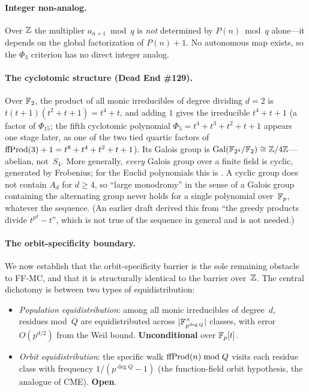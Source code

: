 \paragraph{Integer non-analog.}
Over $\mathbb{Z}$ the multiplier $a_{n+1} \bmod q$ is \emph{not} determined by
$P(n) \bmod q$ alone---it depends on the global factorization of
$P(n)+1$.  No autonomous map exists, so the $\Phi_3$ criterion has no
direct integer analog.

\paragraph{The cyclotomic structure (Dead End \#129).}
Over $\mathbb{F}_2$, the product of all monic irreducibles of degree dividing
$d=2$ is $t(t+1)(t^2+t+1) = t^4+t$, and adding $1$ gives the irreducible
$t^4 + t + 1$ (a factor of $\Phi_{15}$; the fifth cyclotomic polynomial
$\Phi_5 = t^4+t^3+t^2+t+1$ appears one stage later, as one of the two
tied quartic factors of $\mathrm{ffProd}(3)+1 = t^8+t^4+t^2+t+1$).  Its Galois
group is $\mathrm{Gal}(\mathbb{F}_{2^4}/\mathbb{F}_2) \cong \mathbb{Z}/4\mathbb{Z}$---abelian,
not~$S_4$.
More generally, \emph{every} Galois group over a finite field is cyclic,
generated by Frobenius; for the Euclid polynomials this is
.  A cyclic
group does not contain $A_d$ for $d \geq 4$, so ``large monodromy'' in
the sense of a Galois group containing the alternating group never
holds for a single polynomial over~$\mathbb{F}_p$, whatever the sequence.  (An
earlier draft derived this from ``the greedy products divide
$t^{p^d}-t$'', which is not true of the sequence in general and is not
needed.)

\paragraph{The orbit-specificity boundary.}

We now establish that the orbit-specificity barrier is the sole
remaining obstacle to FF-MC, and that it is structurally identical to
the barrier over~$\mathbb{Z}$.  The central dichotomy is between two types of
equidistribution:

\begin{itemize}[nosep,leftmargin=1em]
\item \emph{Population equidistribution}: among all monic irreducibles
  of degree~$d$, residues mod~$Q$ are equidistributed across
  $|\mathbb{F}_{p^{\deg Q}}^\times|$ classes, with error $O(p^{d/2})$ from the
  Weil bound.  \textbf{Unconditional} over $\mathbb{F}_p[t]$.
\item \emph{Orbit equidistribution}: the specific walk
  $\mathrm{ffProd}(n) \bmod Q$ visits each residue class with frequency
  $1/(p^{\deg Q}-1)$ (the function-field orbit hypothesis, the analogue
  of CME).  \textbf{Open}.
\end{itemize}

